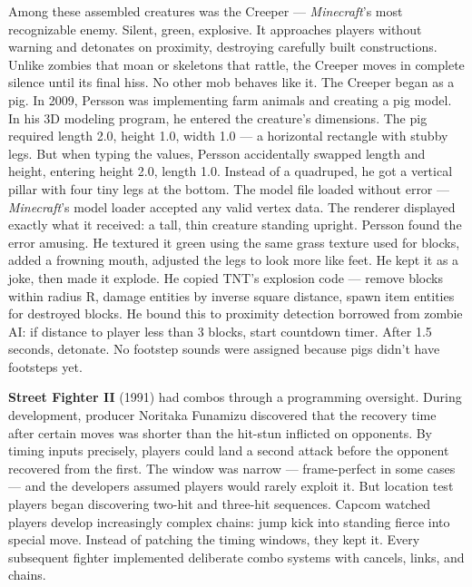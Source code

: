 Among these assembled creatures was the Creeper — \emph{Minecraft}'s most recognizable enemy. Silent, green, explosive. It approaches players without warning and detonates on proximity, destroying carefully built constructions. Unlike zombies that moan or skeletons that rattle, the Creeper moves in complete silence until its final hiss. No other mob behaves like it. The Creeper began as a pig. In 2009, Persson was implementing farm animals and creating a pig model. In his 3D modeling program, he entered the creature's dimensions. The pig required length 2.0, height 1.0, width 1.0 — a horizontal rectangle with stubby legs. But when typing the values, Persson accidentally swapped length and height, entering height 2.0, length 1.0. Instead of a quadruped, he got a vertical pillar with four tiny legs at the bottom. The model file loaded without error — \emph{Minecraft}'s model loader accepted any valid vertex data. The renderer displayed exactly what it received: a tall, thin creature standing upright. Persson found the error amusing. He textured it green using the same grass texture used for blocks, added a frowning mouth, adjusted the legs to look more like feet. He kept it as a joke, then made it explode. He copied TNT's explosion code — remove blocks within radius R, damage entities by inverse square distance, spawn item entities for destroyed blocks. He bound this to proximity detection borrowed from zombie AI: if distance to player less than 3 blocks, start countdown timer. After 1.5 seconds, detonate. No footstep sounds were assigned because pigs didn't have footsteps yet.

\textbf{Street Fighter II} (1991) had combos through a programming oversight. During development, producer Noritaka Funamizu discovered that the recovery time after certain moves was shorter than the hit-stun inflicted on opponents. By timing inputs precisely, players could land a second attack before the opponent recovered from the first. The window was narrow — frame-perfect in some cases — and the developers assumed players would rarely exploit it. But location test players began discovering two-hit and three-hit sequences. Capcom watched players develop increasingly complex chains: jump kick into standing fierce into special move. Instead of patching the timing windows, they kept it.  Every subsequent fighter implemented deliberate combo systems with cancels, links, and chains.

